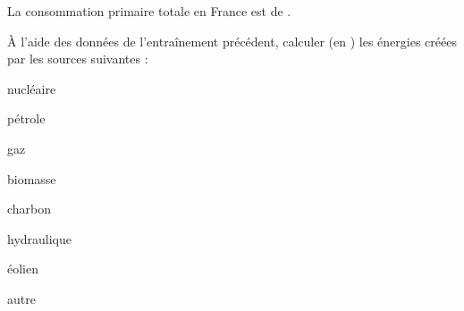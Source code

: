 La consommation primaire totale en France est de . 

À l'aide des données de l'entraînement précédent, calculer (en ) les énergies créées par les sources suivantes : 

\debutEntrainement


\begin{enonce}
nucléaire 
\end{enonce}


\begin{enonce}
pétrole
\end{enonce}


\begin{enonce}
gaz
\end{enonce}


\begin{enonce}
biomasse
\end{enonce}


\begin{enonce}
charbon
\end{enonce}


\begin{enonce}
hydraulique
\end{enonce}


\begin{enonce}
éolien
\end{enonce}


\begin{enonce}
autre
\end{enonce}




\finEntrainement




